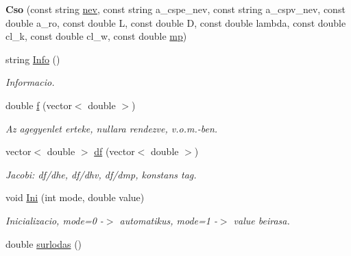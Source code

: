 \begin{DoxyCompactItemize}
\item 
\mbox{\label{class_cso_ab04f2170382860dcff777b7185c62ba7}} 
{\bfseries Cso} (const string \hyperlink{class_agelem_abe92b7e3912367d5d1caf6b277ca0b7d}{nev}, const string a\+\_\+cspe\+\_\+nev, const string a\+\_\+cspv\+\_\+nev, const double a\+\_\+ro, const double L, const double D, const double lambda, const double cl\+\_\+k, const double cl\+\_\+w, const double \hyperlink{class_agelem_a1377d80d8511cc4adacccba31d28282d}{mp})
\item 
\mbox{\label{class_cso_af6a08482d5949b0924459b7588efd2a0}} 
string \hyperlink{class_cso_af6a08482d5949b0924459b7588efd2a0}{Info} ()
\begin{DoxyCompactList}\small\item\em Informacio. \end{DoxyCompactList}\item 
\mbox{\label{class_cso_a5b0e37d3a2f6095e958a7c5f27d8e060}} 
double \hyperlink{class_cso_a5b0e37d3a2f6095e958a7c5f27d8e060}{f} (vector$<$ double $>$)
\begin{DoxyCompactList}\small\item\em Az agegyenlet erteke, nullara rendezve, v.\+o.\+m.-\/ben. \end{DoxyCompactList}\item 
\mbox{\label{class_cso_acc0b1bb6f9558475a097219d88d07267}} 
vector$<$ double $>$ \hyperlink{class_cso_acc0b1bb6f9558475a097219d88d07267}{df} (vector$<$ double $>$)
\begin{DoxyCompactList}\small\item\em Jacobi\+: df/dhe, df/dhv, df/dmp, konstans tag. \end{DoxyCompactList}\item 
\mbox{\label{class_cso_aad51dd17829b413a41f1afb0c275d55c}} 
void \hyperlink{class_cso_aad51dd17829b413a41f1afb0c275d55c}{Ini} (int mode, double value)
\begin{DoxyCompactList}\small\item\em Inicializacio, mode=0 -\/$>$ automatikus, mode=1 -\/$>$ value beirasa. \end{DoxyCompactList}\item 
double \hyperlink{class_cso_a01d6ba01b924fe317638fe196a139d1f}{surlodas} ()

\end{DoxyCompactItemize}
